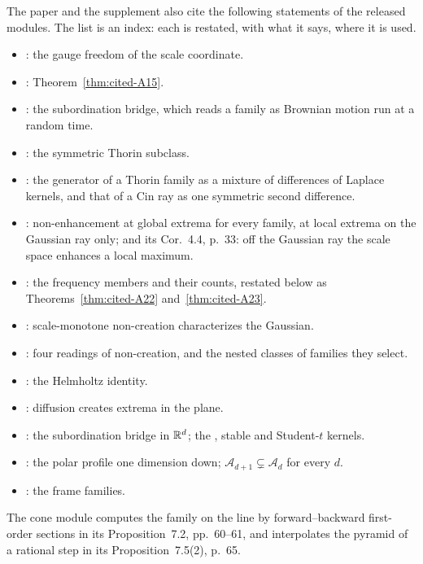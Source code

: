 The paper and the supplement also cite the following statements of the released modules. The list
is an index: each is restated, with what it says, where it is used.
\begin{itemize}
\item {}: the gauge freedom of the scale coordinate.
\item {}: Theorem~\ref{thm:cited-A15}.
\item {}: the subordination bridge, which reads a family as Brownian
motion run at a random time.
\item {}: the symmetric Thorin subclass.
\item {}: the generator of a Thorin family as a mixture of
differences of Laplace kernels, and that of a Cin ray as one symmetric second difference.
\item {}: non-enhancement at global extrema for every family,
at local extrema on the Gaussian ray only; and its Cor.~4.4, p.~33: off the Gaussian ray the scale
space enhances a local maximum.
\item {}: the \Polya{} frequency
members and their counts, restated below as Theorems~\ref{thm:cited-A22} and~\ref{thm:cited-A23}.
\item {}: scale-monotone non-creation characterizes the
Gaussian.
\item {}: four readings of non-creation, and the
nested classes of families they select.
\item {}: the Helmholtz identity.
\item {}: diffusion creates extrema in the plane.
\item {}: the subordination bridge in $\mathbb{R}^d$; the
\Matern{}, stable and Student-$t$ kernels.
\item {}: the polar profile one dimension down;
$\mathcal{A}_{d+1} \subsetneq \mathcal{A}_d$ for every $d$.
\item {}: the frame families.
\end{itemize}
The cone module computes the \Matern{} family on the line by forward--backward first-order sections
in its Proposition~7.2, pp.~60--61, and interpolates the pyramid of a rational step in its
Proposition~7.5(2), p.~65.

